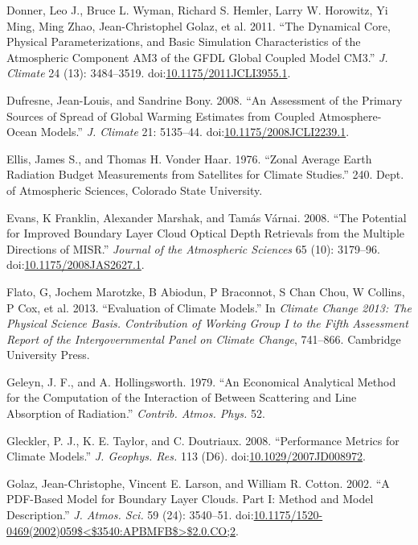 \hypertarget{ref-donnerux5fetux5falux5f2011}{}
Donner, Leo J., Bruce L. Wyman, Richard S. Hemler, Larry W. Horowitz, Yi
Ming, Ming Zhao, Jean-Christophel Golaz, et al. 2011. ``The Dynamical
Core, Physical Parameterizations, and Basic Simulation Characteristics
of the Atmospheric Component AM3 of the GFDL Global Coupled Model CM3.''
\emph{J. Climate} 24 (13): 3484--3519.
doi:\href{https://doi.org/10.1175/2011JCLI3955.1}{10.1175/2011JCLI3955.1}.

\hypertarget{ref-dufresneux5fandux5fbonyux5f2008}{}
Dufresne, Jean-Louis, and Sandrine Bony. 2008. ``An Assessment of the
Primary Sources of Spread of Global Warming Estimates from Coupled
Atmosphere-Ocean Models.'' \emph{J. Climate} 21: 5135--44.
doi:\href{https://doi.org/10.1175/2008JCLI2239.1}{10.1175/2008JCLI2239.1}.

\hypertarget{ref-ellisux5fandux5fvonderhaarux5f1976}{}
Ellis, James S., and Thomas H. Vonder Haar. 1976. ``Zonal Average Earth
Radiation Budget Measurements from Satellites for Climate Studies.''
240. Dept. of Atmospheric Sciences, Colorado State University.

\hypertarget{ref-evansux5fetux5falux5f2008}{}
Evans, K Franklin, Alexander Marshak, and Tamás Várnai. 2008. ``The
Potential for Improved Boundary Layer Cloud Optical Depth Retrievals
from the Multiple Directions of MISR.'' \emph{Journal of the Atmospheric
Sciences} 65 (10): 3179--96.
doi:\href{https://doi.org/10.1175/2008JAS2627.1}{10.1175/2008JAS2627.1}.

\hypertarget{ref-flatoux5fetux5falux5f2013}{}
Flato, G, Jochem Marotzke, B Abiodun, P Braconnot, S Chan Chou, W
Collins, P Cox, et al. 2013. ``Evaluation of Climate Models.'' In
\emph{Climate Change 2013: The Physical Science Basis. Contribution of
Working Group I to the Fifth Assessment Report of the Intergovernmental
Panel on Climate Change}, 741--866. Cambridge University Press.

\hypertarget{ref-geleynux5fandux5fhollingsworthux5f1979}{}
Geleyn, J. F., and A. Hollingsworth. 1979. ``An Economical Analytical
Method for the Computation of the Interaction of Between Scattering and
Line Absorption of Radiation.'' \emph{Contrib. Atmos. Phys.} 52.

\hypertarget{ref-glecklerux5fetux5falux5f2008}{}
Gleckler, P. J., K. E. Taylor, and C. Doutriaux. 2008. ``Performance
Metrics for Climate Models.'' \emph{J. Geophys. Res.} 113 (D6).
doi:\href{https://doi.org/10.1029/2007JD008972}{10.1029/2007JD008972}.

\hypertarget{ref-golazux5fetux5falux5f2002}{}
Golaz, Jean-Christophe, Vincent E. Larson, and William R. Cotton. 2002.
``A PDF-Based Model for Boundary Layer Clouds. Part I: Method and Model
Description.'' \emph{J. Atmos. Sci.} 59 (24): 3540--51.
doi:\href{https://doi.org/10.1175/1520-0469(2002)059$\%3C$3540:APBMFB$\%3E$2.0.CO;2}{10.1175/1520-0469(2002)059\$\textless{}\$3540:APBMFB\$\textgreater{}\$2.0.CO;2}.

